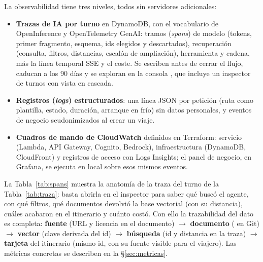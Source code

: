 La observabilidad tiene tres niveles, todos sin servidores adicionales:
\begin{itemize}
  \item \textbf{Trazas de IA por turno} en DynamoDB, con el vocabulario de OpenInference
        y OpenTelemetry GenAI: tramos (\emph{spans}) de modelo (tokens, primer fragmento, esquema, ids
        elegidos y descartados), recuperación (consulta, filtros, distancias, escalón de
        ampliación), herramienta y cadena, más la línea temporal SSE y el coste. Se escriben antes
        de cerrar el flujo, caducan a los 90 días y se exploran en la consola , que
        incluye un inspector de turnos con vista en cascada.
  \item \textbf{Registros (\emph{logs}) estructurados}: una línea JSON por petición (ruta como
        plantilla, estado, duración, arranque en frío) sin datos personales, y eventos de negocio
        seudonimizados al crear un viaje.
  \item \textbf{Cuadros de mando de CloudWatch} definidos en Terraform: servicio (Lambda, API
        Gateway, Cognito, Bedrock), infraestructura (DynamoDB, CloudFront) y registros de acceso con
        Logs Insights; el panel de negocio, en Grafana, se ejecuta en local sobre esos mismos eventos.
\end{itemize}
La Tabla~\ref{tab:spans} muestra la anatomía de la traza del turno de la Tabla~\ref{tab:traza}:
basta abrirla en el inspector para saber qué buscó el agente, con qué filtros, qué documentos
devolvió la base vectorial (con su distancia), cuáles acabaron en el itinerario y cuánto costó.
Con ello la trazabilidad del dato es completa: \textbf{fuente} (URL y licencia en el documento)
$\rightarrow$ \textbf{documento} ( en Git) $\rightarrow$ \textbf{vector} (clave derivada
del id) $\rightarrow$ \textbf{búsqueda} (id y distancia en la traza) $\rightarrow$ \textbf{tarjeta}
del itinerario (mismo id, con su fuente visible para el viajero).
Las métricas concretas se describen en la §\ref{sec:metricas}.

